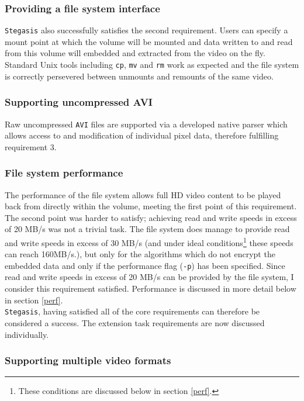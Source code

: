 \documentclass[paper=a4, fontsize=11pt,twoside]{scrartcl}    %
\numberwithin{table}{section}
\numberwithin{figure}{section}
\numberwithin{algorithm}{section}
\begin{document}
\subsubsection{Providing a file system interface}

\texttt{Stegasis} also successfully satisfies the second requirement. Users can specify a mount point at which the volume will be mounted and data written to and read from this volume will embedded and extracted from the video on the fly. Standard Unix tools including \texttt{cp}, \texttt{mv} and \texttt{rm} work as expected and the file system is correctly persevered between unmounts and remounts of the same video.

\subsubsection{Supporting uncompressed AVI}

Raw uncompressed \texttt{AVI} files are supported via a developed native parser which allows access to and modification of individual pixel data, therefore fulfilling requirement 3.

\subsubsection{File system performance}

The performance of the file system allows full HD video content to be played back from directly within the volume, meeting the first point of this requirement. The second point was harder to satisfy; achieving read and write speeds in excess of 20 MB/s was not a trivial task. The file system does manage to provide read and write speeds in excess of 30 MB/s (and under ideal conditions\footnote{These conditions are discussed below in section \ref{perf}.} these speeds can reach 160MB/s.), but only for the algorithms which do not encrypt the embedded data and only if the performance flag (\texttt{-p}) has been specified. Since read and write speeds in excess of 20 MB/s can be provided by the file system, I consider this requirement satisfied. Performance is discussed in more detail below in section \ref{perf}.\\

\noindent
\texttt{Stegasis}, having satisfied all of the core requirements can therefore be considered a success. The extension task requirements are now discussed individually. 

\subsubsection{Supporting multiple video formats}
\end{document}
